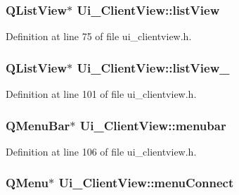 \hypertarget{class_ui___client_view_ab642793b2516ba6e58ebbe2d7fe42fa5}{}
\subsubsection[{list\+View}]{\setlength{\rightskip}{0pt plus 5cm}Q\+List\+View$\ast$ Ui\+\_\+\+Client\+View\+::list\+View}\label{class_ui___client_view_ab642793b2516ba6e58ebbe2d7fe42fa5}


Definition at line 75 of file ui\+\_\+clientview.\+h.

\hypertarget{class_ui___client_view_ab0fd5aa8b588214df2353afe054f8728}{}
\subsubsection[{list\+View\+\_\+2}]{\setlength{\rightskip}{0pt plus 5cm}Q\+List\+View$\ast$ Ui\+\_\+\+Client\+View\+::list\+View\+\_}\label{class_ui___client_view_ab0fd5aa8b588214df2353afe054f8728}


Definition at line 101 of file ui\+\_\+clientview.\+h.

\hypertarget{class_ui___client_view_a1cad8813b8bdbf03b32a5fc9394fe445}{}
\subsubsection[{menubar}]{\setlength{\rightskip}{0pt plus 5cm}Q\+Menu\+Bar$\ast$ Ui\+\_\+\+Client\+View\+::menubar}\label{class_ui___client_view_a1cad8813b8bdbf03b32a5fc9394fe445}


Definition at line 106 of file ui\+\_\+clientview.\+h.

\hypertarget{class_ui___client_view_aa9e581ee0f7e8cc085d1c31050388e22}{}
\subsubsection[{menu\+Connect}]{\setlength{\rightskip}{0pt plus 5cm}Q\+Menu$\ast$ Ui\+\_\+\+Client\+View\+::menu\+Connect}\label{class_ui___client_view_aa9e581ee0f7e8cc085d1c31050388e22}


